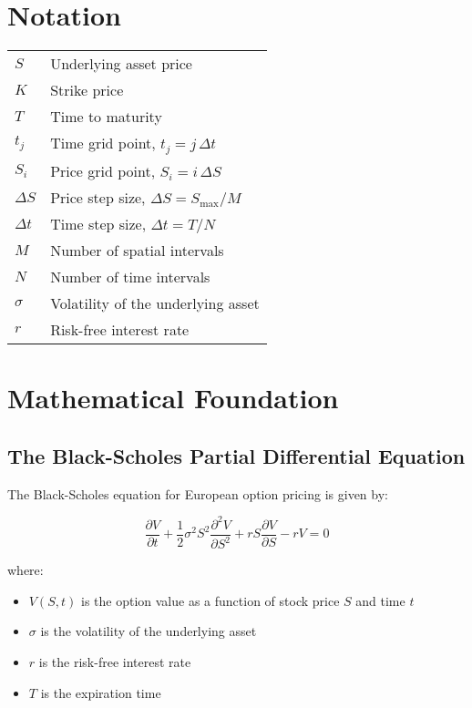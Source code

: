 \documentclass[12pt,a4paper]{article}
\numberwithin{algorithm}{subsection}
\begin{document}
\section*{Notation}
\begin{tabular}{ll}
  $S$ & Underlying asset price \\
  $K$ & Strike price \\
  $T$ & Time to maturity \\
  $t_j$ & Time grid point, $t_j = j\,\Delta t$ \\
  $S_i$ & Price grid point, $S_i = i\,\Delta S$ \\
  $\Delta S$ & Price step size, $\Delta S = S_{\max}/M$ \\
  $\Delta t$ & Time step size, $\Delta t = T/N$ \\
  $M$ & Number of spatial intervals \\
  $N$ & Number of time intervals \\
  $\sigma$ & Volatility of the underlying asset \\
  $r$ & Risk-free interest rate \\
\end{tabular}

\section{Mathematical Foundation}
\label{sec:math-foundation}

\subsection{The Black-Scholes Partial Differential Equation}

The Black-Scholes equation for European option pricing is given by:

\begin{equation}
\frac{\partial V}{\partial t} + \frac{1}{2}\sigma^2 S^2 \frac{\partial^2 V}{\partial S^2} + rS \frac{\partial V}{\partial S} - rV = 0
\end{equation}

where:
\begin{itemize}
\item $V(S,t)$ is the option value as a function of stock price $S$ and time $t$
\item $\sigma$ is the volatility of the underlying asset
\item $r$ is the risk-free interest rate
\item $T$ is the expiration time
\end{itemize}
\end{document}
